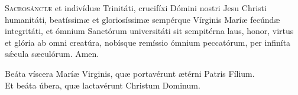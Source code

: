 \documentclass[a4paper, twoside, 12pt]{article}
\begin{document}
\lettrine{{\color{red}S}}{acrosánctæ} et indivíduæ Trinitáti,
crucifíxi Dómini nostri Jesu Christi humanitáti,
beatíssimæ et gloriosíssimæ sempérque Vírginis Maríæ
fecúndæ integritáti, 
et ómnium Sanctórum universitáti
sit sempitérna laus, honor, virtus et glória
ab omni creatúra,
nobísque remíssio ómnium peccatórum,
per infiníta sǽcula sæculórum.
\Rbardot{} Amen.

\noindent \Vbardot{} Beáta víscera Maríæ Virginis, quæ portavérunt
ætérni Patris Fílium.\\
\Rbardot{} Et beáta úbera, quæ lactavérunt Christum Dominum.


\trOratioPostOfficium

\vfill


\cantusSineNeumas

\label{deusinadiutorium}


\vfill
\pagebreak

\cantusCumNeumis

 


\trAntI

\cantusSineNeumas




\vfill
\pagebreak

 


\trAntII




\vfill
\pagebreak

 

\end{document}
